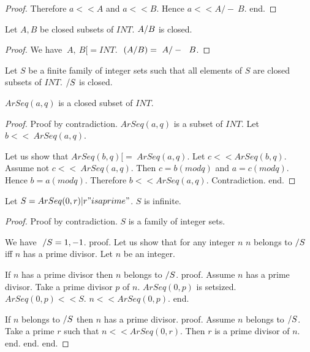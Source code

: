 \documentclass{article}
\begin{document}
\begin{forthel}
\begin{proof}
        Therefore $a << A$ and $a << B$. Hence $a << A /-\ B$.
      end.
    \end{proof}

    \begin{lemma}[UnionClosed]
      Let $A,B$ be closed subsets of $INT$. $A \-/ B$ is closed.
    \end{lemma}
    \begin{proof}
      We have $~A,~B [= INT$. $~(A \-/ B) = ~A /-\ ~B$.
    \end{proof}

    \begin{axiom}[UnionSClosed]
      Let $S$ be a finite family of integer sets such that all elements of $S$ are closed subsets of $INT$. $\-/ S$ is closed.
    \end{axiom}

    \begin{lemma}[ArSeqClosed]
      $ArSeq(a,q)$ is a closed subset of $INT$.
    \end{lemma}
    \begin{proof}
      Proof by contradiction. $ArSeq(a,q)$ is a subset of $INT$. Let $b << ~ArSeq (a,q)$.

      Let us show that $ArSeq(b,q) [= ~ArSeq(a,q)$. Let $c << ArSeq(b,q)$.
        Assume not $c << ~ArSeq(a,q)$. Then $c = b (mod q)$ and $a = c (mod q)$. Hence $b = a (mod q)$. Therefore $b << ArSeq(a,q)$. Contradiction.
      end.
    \end{proof}

    \begin{theorem}[Fuerstenberg]
      Let $S = {ArSeq(0,r) | r "is a prime"}$. $S$ is infinite.
    \end{theorem}
    \begin{proof}
      Proof by contradiction. $S$ is a family of integer sets.

      We have $~ \-/ S = {1, -1}$.
      proof.
        Let us show that for any integer $n$ $n$ belongs to $\-/ S$ iff $n$ has a prime divisor.
          Let $n$ be an integer.

          If $n$ has a prime divisor then $n$ belongs to $\-/ S$.
          proof.
            Assume $n$ has a prime divisor. Take a prime divisor $p$ of $n$. $ArSeq(0,p)$ is setsized. $ArSeq(0,p) << S$. $n << ArSeq(0,p)$.
          end.

          If $n$ belongs to $\-/ S$ then $n$ has a prime divisor.
          proof.
            Assume $n$ belongs to $\-/S$. Take a prime $r$ such that $n << ArSeq(0,r)$. Then $r$ is a prime divisor of $n$.
          end.
        end.
      end.


\end{proof}
\end{forthel}
\end{document}
